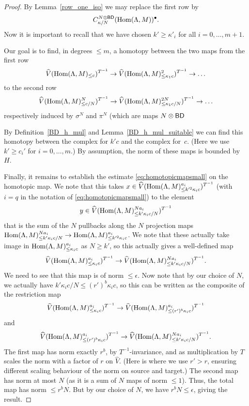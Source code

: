 \begin{proof}
  By Lemma~\ref{row_one_iso} we may replace the first row by
  \[
    C^{N \otimes \mathsf{BD}}_{\kappa/N}(\operatorname{Hom}(\Lambda, M))^\bullet.
  \]
  Now it is important to recall that we have chosen $k' \ge \kappa'_i$ for all $i = 0, \dots, m+1$.

  Our goal is to find,
  in degrees $\leq m$, a homotopy between the two maps from the first row
  \[
    \widehat{V}(\operatorname{Hom}(\Lambda,M)_{\leq c})^{T^{-1}}\to \widehat{V}(\operatorname{Hom}(\Lambda,M)_{\leq \kappa_1c}^2)^{T^{-1}}\to \ldots
  \]
  to the second row
  \[
    \widehat{V}(\operatorname{Hom}(\Lambda,M)_{\leq c/N}^N)^{T^{-1}}\to \widehat{V}(\operatorname{Hom}(\Lambda,M)_{\leq \kappa_1c/N}^{2N})^{T^{-1}}\to \ldots
  \]
  respectively induced by $\sigma^N$ and $\pi^N$ (which are maps $N \otimes \mathsf{BD}$

  By Definition~\ref{BD_h_mul} and Lemma~\ref{BD_h_mul_suitable}
  we can find this homotopy between the complex for $k'c$ and the complex for~$c$.
  (Here we use $k'\geq c_i'$ for $i=0,\ldots,m$.)
  By assumption, the norm of these maps is bounded by~$H$.

  Finally, it remains to establish the estimate \eqref{eq:homotopicmapsmall} on the homotopic map.
  We note that this takes $x\in \widehat{V}(\operatorname{Hom}(\Lambda,M)_{\leq k'^2\kappa_ic}^{a_i})^{T^{-1}}$
  (with $i=q$ in the notation of \eqref{eq:homotopicmapsmall}) to the element
  \[
    y\in \widehat{V}(\operatorname{Hom}(\Lambda,M)_{\leq k'\kappa_ic/N}^{Na_i})^{T^{-1}}
  \]
  that is the sum of the $N$ pullbacks along the $N$ projection maps
  $\operatorname{Hom}(\Lambda,M)_{\leq k'\kappa_ic/N}^{Na_i}\to \operatorname{Hom}(\Lambda,M)_{\leq k'^2\kappa_ic}^{a_i}$.
  We note that these actually take image in $\operatorname{Hom}(\Lambda,M)_{\leq \kappa_ic}^{a_i}$ as $N\geq k'$,
  so this actually gives a well-defined map
  \[
    \widehat{V}(\operatorname{Hom}(\Lambda,M)_{\leq \kappa_ic}^{a_i})^{T^{-1}} \to
    \widehat{V}(\operatorname{Hom}(\Lambda,M)_{\leq k'\kappa_ic/N}^{Na_i})^{T^{-1}}.
  \]
  We need to see that this map is of norm $\leq \epsilon$.
  Now note that by our choice of $N$, we actually have $k'\kappa_ic/N\leq (r')^b \kappa_ic$,
  so this can be written as the composite of the restriction map
  \[
    \widehat{V}(\operatorname{Hom}(\Lambda,M)_{\leq \kappa_ic}^{a_i})^{T^{-1}} \to
    \widehat{V}(\operatorname{Hom}(\Lambda,M)_{\leq (r')^b \kappa_ic}^{a_i})^{T^{-1}}
  \]
  and
  \[
    \widehat{V}(\operatorname{Hom}(\Lambda,M)_{\leq (r')^b \kappa_ic}^{a_i})^{T^{-1}} \to
    \widehat{V}(\operatorname{Hom}(\Lambda,M)_{\leq k'\kappa_ic/N}^{Na_i})^{T^{-1}}.
  \]
  The first map has norm exactly $r^b$, by $T^{-1}$-invariance,
  and as multiplication by $T$ scales the norm with a factor of $r$ on $\widehat{V}$.
  (Here is where we use $r'>r$, ensuring different scaling behaviour of the norm on source and target.)
  The second map has norm at most $N$ (as it is a sum of $N$ maps of norm $\leq 1$).
  Thus, the total map has norm $\leq r^bN$. But by our choice of $N$, we have $r^bN\leq \epsilon$, giving the result.
\end{proof}

